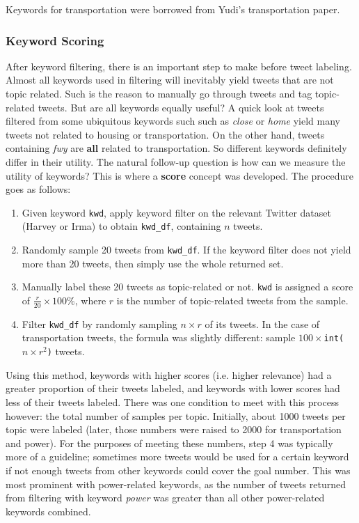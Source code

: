 \documentclass[12pt, a4paper]{article}
\begin{document}
    Keywords for transportation were borrowed from Yudi's transportation paper.
\subsubsection{Keyword Scoring}
    After keyword filtering, there is an important step to make before tweet labeling. Almost all keywords used in filtering will inevitably yield tweets that are not topic related. Such is the reason to manually go through tweets and tag topic-related tweets. But are all keywords equally useful? A quick look at tweets filtered from some ubiquitous keywords such such as \textit{close} or \textit{home} yield many tweets not related to housing or transportation. On the other hand, tweets containing \textit{fwy} are \textbf{all} related to transportation. So different keywords definitely differ in their utility. The natural follow-up question is how can we measure the utility of keywords? This is where a \textbf{score} concept was developed. The procedure goes as follows:
    \begin{enumerate}
        \item Given keyword \texttt{kwd}, apply keyword filter on the relevant Twitter dataset (Harvey or Irma) to obtain \texttt{kwd\_df}, containing $n$ tweets.
        
        \item Randomly sample 20 tweets from \texttt{kwd\_df}. If the keyword filter does not yield more than 20 tweets, then simply use the whole returned set.
        
        \item Manually label these 20 tweets as topic-related or not. \texttt{kwd} is assigned a score of $\frac{r}{20} \times 100\%$, where $r$ is the number of topic-related tweets from the sample.
        
        \item Filter \texttt{kwd\_df} by randomly sampling $n\times r$ of its tweets. In the case of transportation tweets, the formula was slightly different: sample $100 \times $\texttt{int(}$n\times r^2$\texttt{)} tweets.
    \end{enumerate}
    Using this method, keywords with higher scores (i.e. higher relevance) had a greater proportion of their tweets labeled, and keywords with lower scores had less of their tweets labeled. There was one condition to meet with this process however: the total number of samples per topic. Initially, about 1000 tweets per topic were labeled (later, those numbers were raised to 2000 for transportation and power). For the purposes of meeting these numbers, step 4 was typically more of a guideline; sometimes more tweets would be used for a certain keyword if not enough tweets from other keywords could cover the goal number. This was most prominent with power-related keywords, as the number of tweets returned from filtering with keyword \textit{power} was greater than all other power-related keywords combined.\\
    
\end{document}
